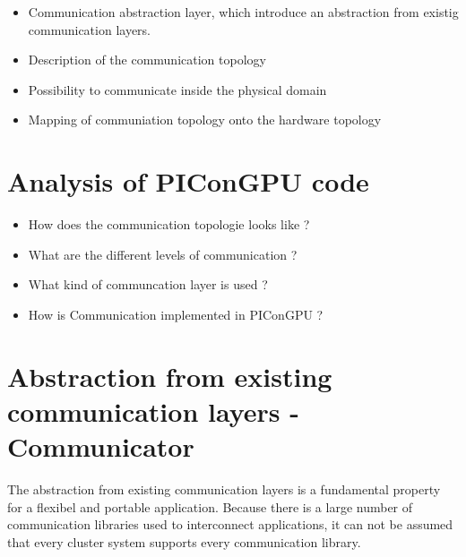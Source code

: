 \begin{itemize}
\item Communication abstraction layer, which introduce an abstraction
  from existig communication layers.
\item Description of the communication topology
\item Possibility to communicate inside the physical domain
\item Mapping of communiation topology onto the hardware topology
\end{itemize}

\section{Analysis of PIConGPU code}
\begin{itemize}
  \item How does the communication topologie looks like ?
  \item What are the different levels of communication ?
  \item What kind of communcation layer is used ?
  \item How is Communication implemented in PIConGPU ?
\end{itemize}

\section{Abstraction from existing communication layers - Communicator}

The abstraction from existing communication layers is a fundamental
property for a flexibel and portable application. Because there is a
large number of communication libraries used to interconnect
applications, it can not be assumed that every cluster system
supports every communication library.

